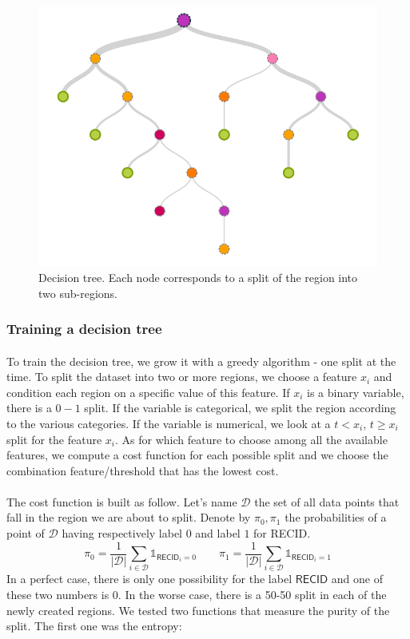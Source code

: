 \documentclass[a4paper]{article}
\theoremstyle{plain}
\begin{document}
\begin{figure}[H]
\centering
\includegraphics[scale=0.3]{decision_tree.png}
\caption{Decision tree. Each node corresponds to a split of the region into two sub-regions.}
\end{figure}

\subsubsection*{Training a decision tree}

\paragraph{}
To train the decision tree, we grow it with a greedy algorithm - one split at the time. To split the dataset into two or more regions, we choose a feature $x_i$ and condition each region on a specific value of this feature. If $x_i$ is a binary variable, there is a $0-1$ split. If the variable is categorical, we split the region according to the various categories. If the variable is numerical, we look at a $t < x_i$, $t \geq x_i$ split for the feature $x_i$. As for which feature to choose among all the available features, we compute a cost function for each possible split and we choose the combination feature/threshold that has the lowest cost.

\paragraph{}
The cost function is built as follow. Let's name $\mathcal{D}$ the set of all data points that fall in the region we are about to split. Denote by $\pi_0, \pi_1$ the probabilities of a point of $\mathcal{D}$ having respectively label $0$ and label $1$ for \textsf{RECID}.
$$ \pi_0 = \frac{1}{|\mathcal{D}|} \sum_{i \in \mathcal{D}} \mathds{1}_{\mathsf{RECID}_i = 0} \qquad  \pi_1 = \frac{1}{|\mathcal{D}|} \sum_{i \in \mathcal{D}} \mathds{1}_{\mathsf{RECID}_i = 1} $$
In a perfect case, there is only one possibility for the label $\mathsf{RECID}$ and one of these two numbers is $0$. In the worse case, there is a 50-50 split in each of the newly created regions. We tested two functions that measure the purity of the split. The first one was the entropy:
\end{document}
